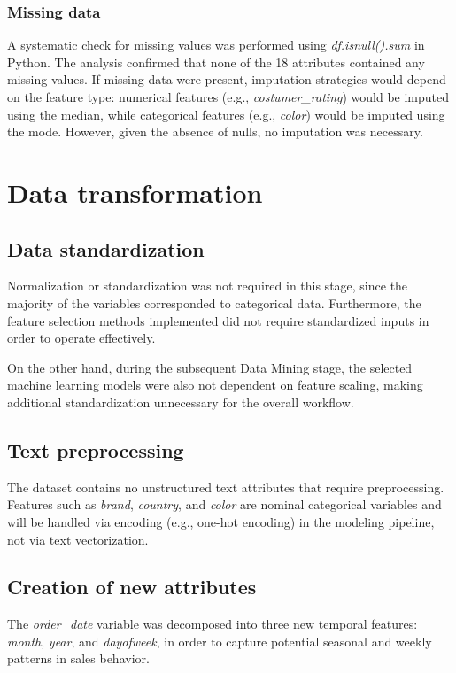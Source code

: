 \documentclass[12pt]{article}
\begin{document}
\subsubsection{Missing data}
A systematic check for missing values was performed using \textit{df.isnull().sum} in Python. The analysis confirmed that none of the 18 attributes contained any missing values. If missing data were present, imputation strategies would depend on the feature type: numerical features (e.g., \textit{costumer\_rating}) would be imputed using the median, while categorical features (e.g., \textit{color}) would be imputed using the mode. However, given the absence of nulls, no imputation was necessary.

\section{Data transformation}

\subsection{Data standardization}

Normalization or standardization was not required in this stage, since the majority of the variables corresponded to categorical data. Furthermore, the feature selection methods implemented did not require standardized inputs in order to operate effectively. 

On the other hand, during the subsequent Data Mining stage, the selected machine learning models were also not dependent on feature scaling, making additional standardization unnecessary for the overall workflow.

\subsection{Text preprocessing}
The dataset contains no unstructured text attributes that require preprocessing. Features such as \textit{brand}, \textit{country}, and \textit{color} are nominal categorical variables and will be handled via encoding (e.g., one-hot encoding) in the modeling pipeline, not via text vectorization.

\subsection{Creation of new attributes}
The \textit{order\_date} variable was decomposed into three new temporal features: \textit{month}, \textit{year}, and \textit{dayofweek}, in order to capture potential seasonal and weekly patterns in sales behavior.
\end{document}
